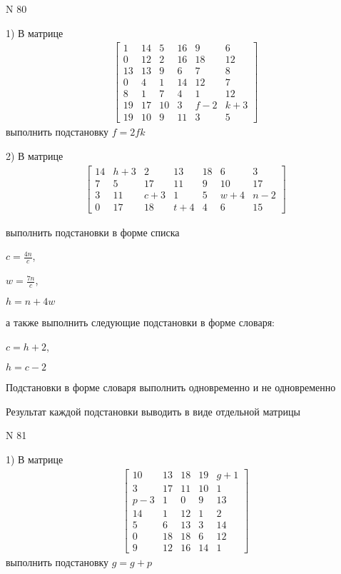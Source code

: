 \documentclass[11pt]{report}
\begin{document}
\newpage
N 80


    1) В матрице
\begin{align*}
\left[\begin{matrix}1 & 14 & 5 & 16 & 9 & 6\\0 & 12 & 2 & 16 & 18 & 12\\13 & 13 & 9 & 6 & 7 & 8\\0 & 4 & 1 & 14 & 12 & 7\\8 & 1 & 7 & 4 & 1 & 12\\19 & 17 & 10 & 3 & f - 2 & k + 3\\19 & 10 & 9 & 11 & 3 & 5\end{matrix}\right]
\end{align*}
выполнить подстановку $f=2 f k$


    2) В матрице
\begin{align*}
\left[\begin{matrix}14 & h + 3 & 2 & 13 & 18 & 6 & 3\\7 & 5 & 17 & 11 & 9 & 10 & 17\\3 & 11 & c + 3 & 1 & 5 & w + 4 & n - 2\\0 & 17 & 18 & t + 4 & 4 & 6 & 15\end{matrix}\right]
\end{align*}

выполнить подстановки в форме списка

$c=\frac{4 n}{c}$,

$w=\frac{7 n}{c}$,

$h=n + 4 w$

а также выполнить следующие подстановки в форме словаря:

$c=h + 2$,

$h=c - 2$


    Подстановки в форме словаря выполнить одновременно и не одновременно


    Результат каждой подстановки выводить в виде отдельной матрицы

\newpage
N 81


    1) В матрице
\begin{align*}
\left[\begin{matrix}10 & 13 & 18 & 19 & g + 1\\3 & 17 & 11 & 10 & 1\\p - 3 & 1 & 0 & 9 & 13\\14 & 1 & 12 & 1 & 2\\5 & 6 & 13 & 3 & 14\\0 & 18 & 18 & 6 & 12\\9 & 12 & 16 & 14 & 1\end{matrix}\right]
\end{align*}
выполнить подстановку $g=g + p$
\end{document}
